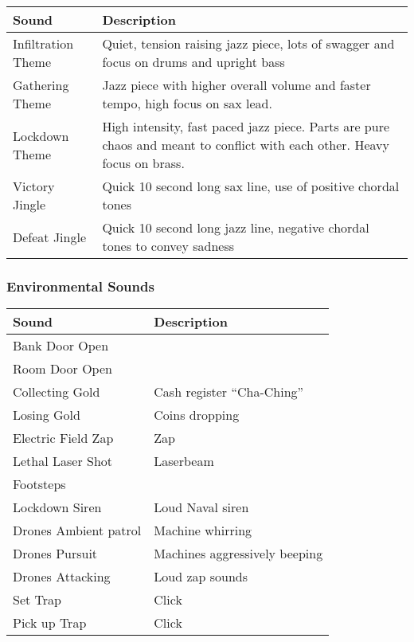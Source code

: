 \documentclass[10pt]{report}
\begin{document}
\begin{center}
    \begin{tabular}{| p{.45\linewidth} | p{.45\linewidth} |}
        \hline
        \textbf{Sound} & \textbf{Description} \\  \hline
        Infiltration Theme  &     Quiet, tension raising jazz piece, lots of swagger and focus on drums and upright bass \\ \hline
        Gathering Theme    &     Jazz piece with higher overall volume and faster tempo, high focus on sax lead. \\ \hline
        Lockdown Theme  &     High intensity, fast paced jazz piece. Parts are pure chaos and meant to conflict with each other. Heavy focus on brass. \\ \hline
        Victory Jingle  &     Quick 10 second long sax line, use of positive chordal tones \\ \hline
        Defeat Jingle   &     Quick 10 second long jazz line, negative chordal tones to convey sadness \\
        \hline
    \end{tabular}
\end{center}

\subsubsection{Environmental Sounds}

\begin{center}
    \begin{tabular}{| p{.45\linewidth} | p{.45\linewidth} |}
        \hline
        \textbf{Sound} & \textbf{Description} \\  \hline
        Bank Door Open  &  \\   \hline
        Room Door Open  &  \\   \hline
        Collecting Gold & Cash register “Cha-Ching” \\  \hline
        Losing Gold & Coins dropping \\ \hline
        Electric Field Zap  & Zap \\    \hline
        Lethal Laser Shot   & Laserbeam \\  \hline
        Footsteps   &  \\   \hline
        Lockdown Siren  & Loud Naval siren \\   \hline
        Drones Ambient patrol   & Machine whirring \\   \hline
        Drones Pursuit  & Machines aggressively beeping \\  \hline
        Drones Attacking    & Loud zap sounds \\    \hline
        Set Trap    & Click \\  \hline
        Pick up Trap    & Click \\
        \hline
    \end{tabular}
\end{center}
\end{document}
